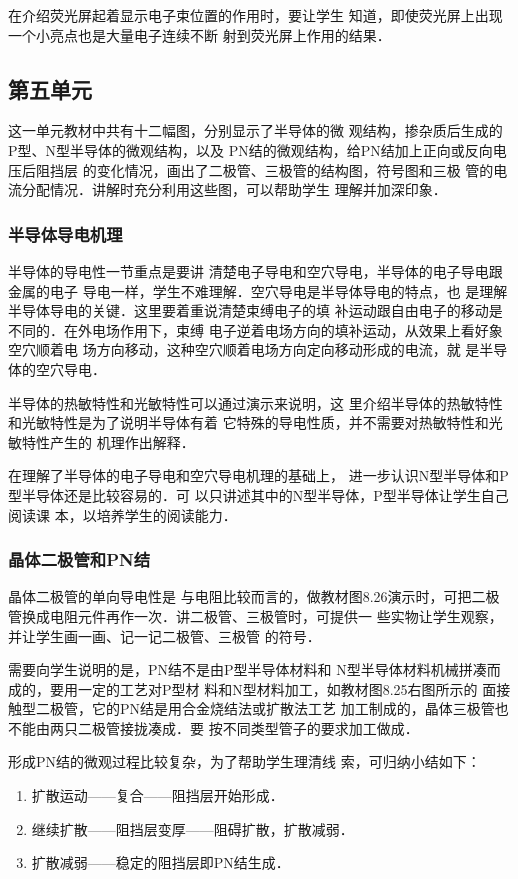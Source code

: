 在介绍荧光屏起着显示电子束位置的作用时，要让学生
知道，即使荧光屏上出现一个小亮点也是大量电子连续不断
射到荧光屏上作用的结果．


\subsection{第五单元}
这一单元教材中共有十二幅图，分别显示了半导体的微
观结构，掺杂质后生成的P型、N型半导体的微观结构，以及
PN结的微观结构，给PN结加上正向或反向电压后阻挡层
的变化情况，画出了二极管、三极管的结构图，符号图和三极
管的电流分配情况．讲解时充分利用这些图，可以帮助学生
理解并加深印象．

\subsubsection{半导体导电机理}

半导体的导电性一节重点是要讲
清楚电子导电和空穴导电，半导体的电子导电跟金属的电子
导电一样，学生不难理解．空穴导电是半导体导电的特点，也
是理解半导体导电的关键．这里要着重说清楚束缚电子的填
补运动跟自由电子的移动是不同的．在外电场作用下，束缚
电子逆着电场方向的填补运动，从效果上看好象空穴顺着电
场方向移动，这种空穴顺着电场方向定向移动形成的电流，就
是半导体的空穴导电．

半导体的热敏特性和光敏特性可以通过演示来说明，这
里介绍半导体的热敏特性和光敏特性是为了说明半导体有着
它特殊的导电性质，并不需要对热敏特性和光敏特性产生的
机理作出解释．

在理解了半导体的电子导电和空穴导电机理的基础上，
进一步认识N型半导体和P型半导体还是比较容易的．可
以只讲述其中的N型半导体，P型半导体让学生自己阅读课
本，以培养学生的阅读能力．

\subsubsection{晶体二极管和PN结} 

晶体二极管的单向导电性是
与电阻比较而言的，做教材图8.26演示时，可把二极
管换成电阻元件再作一次．讲二极管、三极管时，可提供一
些实物让学生观察，并让学生画一画、记一记二极管、三极管
的符号．

需要向学生说明的是，PN结不是由P型半导体材料和
N型半导体材料机械拼凑而成的，要用一定的工艺对P型材
料和N型材料加工，如教材图8.25右图所示的
面接触型二极管，它的PN结是用合金烧结法或扩散法工艺
加工制成的，晶体三极管也不能由两只二极管接拢凑成．要
按不同类型管子的要求加工做成．

形成PN结的微观过程比较复杂，为了帮助学生理清线
索，可归纳小结如下：
\begin{enumerate}
\item 扩散运动——复合——阻挡层开始形成．
\item 继续扩散——阻挡层变厚——阻碍扩散，扩散减弱．
\item 扩散减弱——稳定的阻挡层即PN结生成．
\end{enumerate}

